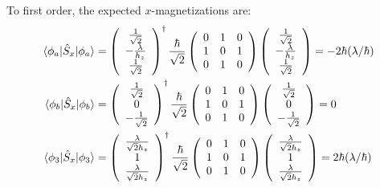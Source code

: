 \documentclass[10pt]{article}
\newcommand{\1}{\mathbf 1}
\begin{document}
To first order, the expected $x$-magnetizations are:
\begin{align}
	\braket{\phi_a|\hat S_x | \phi_a}
	&=
	\left(
\begin{array}{c}
 \frac{1}{\sqrt{2}} \\
 -\frac{\lambda }{h_z} \\
 \frac{1}{\sqrt{2}} \\
\end{array}
\right)^\dagger
\frac{\hbar}{\sqrt{2}}
\left(
\begin{array}{ccc}
 0 & 1 & 0 \\
 1 & 0 & 1 \\
 0 & 1 & 0 \\
\end{array}
\right)
		\left(
\begin{array}{c}
 \frac{1}{\sqrt{2}} \\
 -\frac{\lambda }{h_z} \\
 \frac{1}{\sqrt{2}} \\
\end{array}
\right)
=
-
{2 \hbar (\lambda/\hbar)}
\\
\braket{\phi_b|\hat S_x | \phi_b}
&=
\left(
\begin{array}{c}
\frac{1}{\sqrt{2}} \\
0\\
-\frac{1}{\sqrt{2}} \\
\end{array}
\right)^\dagger
\frac{\hbar}{\sqrt{2}}
\left(
\begin{array}{ccc}
0 & 1 & 0 \\
1 & 0 & 1 \\
0 & 1 & 0 \\
\end{array}
\right)
	\left(
\begin{array}{c}
\frac{1}{\sqrt{2}} \\
0 \\
-\frac{1}{\sqrt{2}} \\
\end{array}
\right)
=
0
\\
\braket{\phi_3 | \hat S_x | \phi_3}
&=
\left(
\begin{array}{c}
 \frac{\lambda }{\sqrt{2} h_z} \\
 1 \\
 \frac{\lambda }{\sqrt{2} h_z} \\
\end{array}
\right)^\dagger
\frac{\hbar}{\sqrt{2}}
\left(
\begin{array}{ccc}
0 & 1 & 0 \\
1 & 0 & 1 \\
0 & 1 & 0 \\
\end{array}
\right)
\left(
\begin{array}{c}
 \frac{\lambda }{\sqrt{2} h_z} \\
 1 \\
 \frac{\lambda }{\sqrt{2} h_z} \\
\end{array}
\right)
=
{2 \hbar (\lambda/\hbar)}
\end{align}
\end{document}
